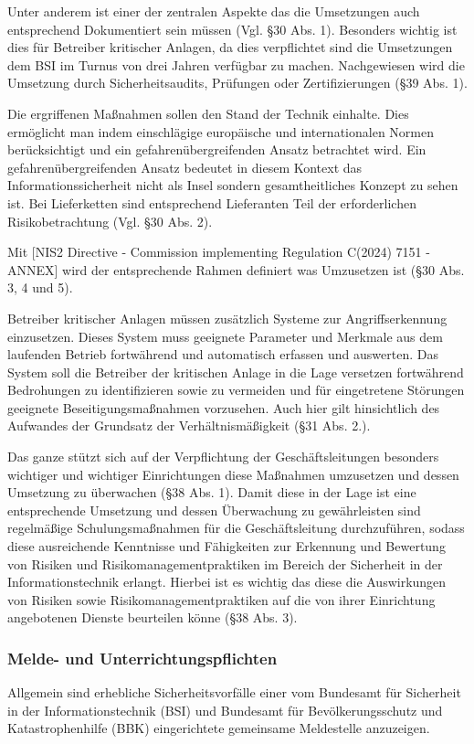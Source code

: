 \documentclass[11pt,a4paper]{article}   %
\begin{document}
        Unter anderem ist einer der zentralen Aspekte das die Umsetzungen auch entsprechend Dokumentiert sein müssen (Vgl. §30 Abs. 1). Besonders wichtig ist dies für Betreiber kritischer Anlagen, da dies verpflichtet sind die Umsetzungen dem BSI im Turnus von drei Jahren verfügbar zu machen. Nachgewiesen wird die Umsetzung durch Sicherheitsaudits, Prüfungen oder Zertifizierungen (§39 Abs. 1).

        Die ergriffenen Maßnahmen sollen den Stand der Technik einhalte. Dies ermöglicht man indem einschlägige europäische und internationalen Normen berücksichtigt und ein gefahrenübergreifenden Ansatz betrachtet wird. Ein gefahrenübergreifenden Ansatz bedeutet in diesem Kontext das Informationssicherheit nicht als Insel sondern gesamtheitliches Konzept zu sehen ist. Bei Lieferketten sind entsprechend Lieferanten Teil der erforderlichen Risikobetrachtung (Vgl. §30 Abs. 2). 

        Mit [NIS2 Directive - Commission implementing Regulation C(2024) 7151 - ANNEX] wird der entsprechende Rahmen definiert was Umzusetzen ist (§30 Abs. 3, 4 und 5).

        Betreiber kritischer Anlagen müssen zusätzlich Systeme zur Angriffserkennung einzusetzen. Dieses System muss geeignete Parameter und Merkmale aus dem laufenden Betrieb fortwährend und automatisch erfassen und auswerten. Das System soll die Betreiber der kritischen Anlage in die Lage versetzen fortwährend Bedrohungen zu identifizieren sowie zu vermeiden und für eingetretene Störungen geeignete Beseitigungsmaßnahmen vorzusehen. Auch hier gilt hinsichtlich des Aufwandes der Grundsatz der Verhältnismäßigkeit (§31 Abs. 2.).

        Das ganze stützt sich auf der Verpflichtung der Geschäftsleitungen besonders wichtiger und wichtiger Einrichtungen diese Maßnahmen umzusetzen und dessen Umsetzung zu überwachen (§38 Abs. 1). Damit diese in der Lage ist eine entsprechende Umsetzung und dessen Überwachung zu gewährleisten sind regelmäßige Schulungsmaßnahmen für die Geschäftsleitung durchzuführen, sodass diese ausreichende Kenntnisse und Fähigkeiten zur Erkennung und Bewertung von Risiken und Risikomanagementpraktiken im Bereich der Sicherheit in der Informationstechnik erlangt. Hierbei ist es wichtig das diese die Auswirkungen von Risiken sowie Risikomanagementpraktiken auf die von ihrer Einrichtung angebotenen Dienste beurteilen könne (§38 Abs. 3).

        \subsubsection{Melde- und Unterrichtungspflichten}
        Allgemein sind erhebliche Sicherheitsvorfälle einer vom Bundesamt für Sicherheit in der Informationstechnik (BSI) und Bundesamt für Bevölkerungsschutz und Katastrophenhilfe (BBK) eingerichtete gemeinsame Meldestelle anzuzeigen. 
\end{document}

